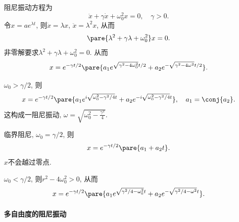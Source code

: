 \documentclass{ctexart}
\begin{document}
阻尼振动方程为
\[ \ddot{x} + \gamma\dot{x} + \omega_0^2 x = 0,\quad \gamma>0. \]
令$x = ae^{\lambda t}$, 则$\dot{x} = \lambda x$, $\ddot{x} = \lambda^2 x$, 从而
\[ \pare{\lambda^2 + \gamma\lambda + \omega_0^2} x = 0. \]
非零解要求$\lambda^2 + \gamma\lambda + \omega_0^2 = 0$. 从而
\[ x = e^{-\gamma t/2} \pare{a_1 e^{\sqrt{\gamma^2 - 4\omega_0^2}t/2} + a_2 e^{-\sqrt{\gamma^2 - 4\omega^2}t/2}}. \]
\begin{cenum}
    \item $\omega_0 > \gamma/2$, 则
    \[ x = e^{-\gamma t/2} \pare{a_1 e^{i\sqrt{\omega_0^2 - \gamma^2/4}t} + a_2 e^{-i\sqrt{\omega_0^2 - \gamma^2/4}t}},\quad a_1 = \conj{a_2}. \]
    这构成一阻尼振动, $\displaystyle \omega = \sqrt{\omega_0^2 - \frac{\gamma^2}{4}}$.
    \item 临界阻尼, $\omega_0 = \gamma/2$, 则
    \[ x = e^{-\gamma t/2} \pare{a_1 + a_2 t}. \]
    $x$不会越过零点.
    \item $\omega_0 < \gamma/2$, 则$r^2 - 4\omega_0^2 > 0$, 从而
    \[ x = e^{-\gamma t/2}\pare{a_1 e^{\sqrt{\gamma^2/4 - \omega_0^2}t} + a_2 e^{-\sqrt{\gamma^2/4 - \omega^2}t}}. \]
\end{cenum}

\paragraph{多自由度的阻尼振动} %
\label{par:多自由度的阻尼振动}
\end{document}
